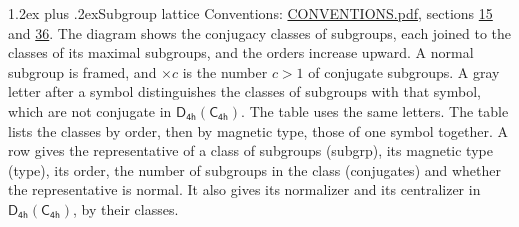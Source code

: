 \documentclass[10pt,a4paper]{article}
\makeatletter
\renewcommand\section{\@startsection{section}{1}{\z@}{-3ex plus -1ex minus -.2ex}%
  {1.2ex plus .2ex}{\normalfont\large\sffamily\bfseries\color{parttitle}}}
\numberwithin{equation}{section}
\newcommand{\grp}[1]{\mathsf{#1}}
\makeatother
\begin{document}
\section{Subgroup lattice}\label{s:subgroups}
Conventions: \href{../../CONVENTIONS.pdf}{CONVENTIONS.pdf}, sections \href{../../../rotation/CONVENTIONS.pdf\#conv.15}{15} and \href{../../CONVENTIONS.pdf\#conv.36}{36}.
The diagram shows the conjugacy classes of subgroups, each joined to the classes of its maximal subgroups, and the orders increase upward. \label{n:index.conjugates.c}\label{n:mark.conjugates}A normal subgroup is framed, and ${\times}c$ is the number $c > 1$ of conjugate subgroups. \label{n:mark.letter}A gray letter after a symbol distinguishes the classes of subgroups with that symbol, which are not conjugate in $\grp{D_{4h}}(\grp{C_{4h}})$. The table uses the same letters. The table lists the classes by order, then by magnetic type, those of one symbol together. \label{n:head.subgroup}\label{n:head.magnetic.type}\label{n:head.order}\label{n:head.conjugates}\label{n:head.normal}A row gives the representative of a class of subgroups (subgrp), its magnetic type (type), its order, the number of subgroups in the class (conjugates) and whether the representative is normal. \label{n:head.normalizer}\label{n:head.centralizer}It also gives its normalizer and its centralizer in $\grp{D_{4h}}(\grp{C_{4h}})$, by their classes. 
\end{document}
